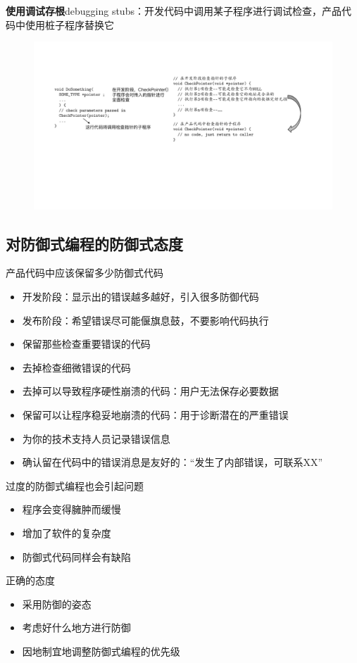 \textbf{使用调试存根}debugging stubs：开发代码中调用某子程序进行调试检查，产品代码中使用桩子程序替换它
\begin{figure}[H]
    \vspace{-0.5em}
	\centering
	\includegraphics[width=\textwidth]{images/使用调试存根.pdf}
    \vspace{-1em}
\end{figure}


\subsection{对防御式编程的防御式态度}
产品代码中应该保留多少防御式代码
\begin{itemize}
    \item 开发阶段：显示出的错误越多越好，引入很多防御代码
    \item 发布阶段：希望错误尽可能偃旗息鼓，不要影响代码执行
    \item 保留那些检查重要错误的代码
    \item 去掉检查细微错误的代码
    \item 去掉可以导致程序硬性崩溃的代码：用户无法保存必要数据
    \item 保留可以让程序稳妥地崩溃的代码：用于诊断潜在的严重错误
    \item 为你的技术支持人员记录错误信息
    \item 确认留在代码中的错误消息是友好的：“发生了内部错误，可联系XX”
\end{itemize}

\vspace{-0.8em}
\begin{multicols}{2}
    过度的防御式编程也会引起问题
\begin{itemize}
    \item 程序会变得臃肿而缓慢
    \item 增加了软件的复杂度
    \item 防御式代码同样会有缺陷
\end{itemize}

正确的态度
\begin{itemize}
    \item 采用防御的姿态
    \item 考虑好什么地方进行防御
    \item 因地制宜地调整防御式编程的优先级
\end{itemize}
\end{multicols}
\vspace{-1em}



